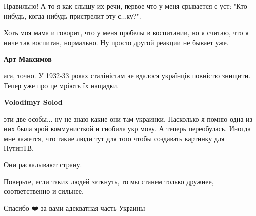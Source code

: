 \begin{itemize}
 

Правильно! А то я как слышу их речи, первое что у меня срывается с уст:
"Кто-нибудь, когда-нибудь пристрелит эту с...ку?".

Хоть моя мама и говорит, что у меня пробелы в воспитании, но я считаю, что я
ниче так воспитан, нормально. Ну просто другой реакции не бывает уже. \Smiley[1.0][yellow]

\begin{itemize}
 
\textbf{Арт Максимов} 

ага, точно. У 1932-33 роках сталіністам не вдалося українців повністю знищити.
Тепер уже про це мріють їх нащадки.


 
\textbf{Volodimyr Solod} 

эти две особы... ну не знаю какие они там украинки. Насколько я помню одна из
них была ярой коммунисткой и гнобила укр мову. А теперь переобулась. Иногда мне
кажется, что такие люди тут для того чтобы создавать картинку для ПутинТВ.

Они раскалывают страну.

Поверьте, если таких людей заткнуть, то мы станем только дружнее,
соответственно и сильнее.

\end{itemize}

 
Спасибо ❤️ за вами адекватная часть Украины 💪

\begin{itemize}
 

\end{itemize}
\end{itemize}
